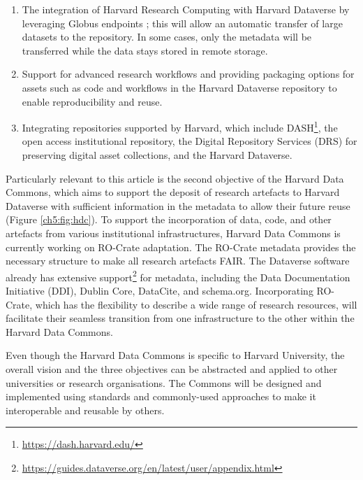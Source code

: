 \begin{enumerate}
\item
  The integration of Harvard Research Computing with Harvard Dataverse
  by leveraging Globus endpoints
  \cite{Chard 2014}; this will allow
  an automatic transfer of large datasets to the repository. In some
  cases, only the metadata will be transferred while the data stays
  stored in remote storage.
\item
  Support for advanced research workflows and providing packaging
  options for assets such as code and workflows in the Harvard Dataverse
  repository to enable reproducibility and reuse.
\item
  Integrating repositories supported by Harvard, which include
  DASH\footnote{\url{https://dash.harvard.edu/}}, the open access institutional
  repository, the Digital Repository Services (DRS) for preserving
  digital asset collections, and the Harvard Dataverse.
\end{enumerate}

Particularly relevant to this article is the second objective of the
Harvard Data Commons, which aims to support the deposit of research
artefacts to Harvard Dataverse with sufficient information in the
metadata to allow their future reuse (Figure \vref{ch5:fig:hdc}). To support the incorporation of data, code, and other artefacts
from various institutional infrastructures, Harvard Data Commons is
currently working on RO-Crate adaptation. The RO-Crate metadata provides
the necessary structure to make all research artefacts FAIR. The
Dataverse software already has
extensive
support\footnote{\url{https://guides.dataverse.org/en/latest/user/appendix.html}} for metadata, including the Data Documentation Initiative
(DDI), Dublin Core, DataCite, and schema.org. Incorporating RO-Crate,
which has the flexibility to describe a wide range of research
resources, will facilitate their seamless transition from one
infrastructure to the other within the Harvard Data Commons.

Even though the Harvard Data Commons is specific to Harvard University,
the overall vision and the three objectives can be abstracted and
applied to other universities or research organisations. The Commons
will be designed and implemented using standards and commonly-used
approaches to make it interoperable and reusable by others.


